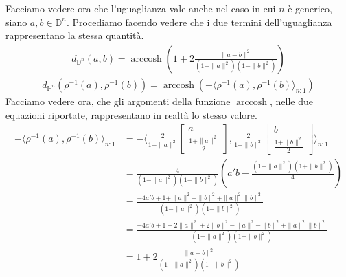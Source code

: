 \documentclass[a4paper, 12pt]{article}
\DeclareMathOperator\arccosh{arccosh}
\begin{document}
\\\\
Facciamo vedere ora che l'uguaglianza vale anche nel caso in cui $n$ è generico, siano $a, b \in \mathbb{D}^n$. Procediamo facendo vedere che i due termini dell'uguaglianza rappresentano la stessa quantità.\\
\begin{equation*}\begin{gathered}
d_{\mathbb{D}^n}(a,b) = \arccosh(1 + 2\frac{\| a - b \|^2}{(1 - \| a \|^2)(1 - \| b \|^2)})
\end{gathered}\end{equation*}
\begin{equation*}\begin{gathered}
d_{\mathbb{H}^n}(\rho^{-1}(a),\rho^{-1}(b)) = \arccosh(- \langle \rho^{-1}(a),\rho^{-1}(b) \rangle_{n:1})
\end{gathered}\end{equation*}
Facciamo vedere ora, che gli argomenti della funzione $\arccosh$, nelle due equazioni riportate, rappresentano in realtà lo stesso valore.
\begin{equation*}\begin{split}
- \langle \rho^{-1}(a),\rho^{-1}(b) \rangle_{n:1} &= - \langle \frac{2}{1 - \| a \|^2} \begin{bmatrix} a \\ \frac{1 + \| a \|^2}{2} \end{bmatrix}, \frac{2}{1 - \| b \|^2} \begin{bmatrix} b \\ \frac{1 + \| b \|^2}{2} \end{bmatrix} \rangle_{n:1}\\
&=\frac{4}{(1 - \| a \|^2)(1 - \| b \|^2)} \left( a'b - \frac{(1 + \| a \|^2)(1 + \| b \|^2)}{4} \right)\\
&=\frac{-4a'b + 1 + \| a \|^2 + \| b \|^2 + \| a \|^2 \| b \|^2}{(1 - \| a \|^2)(1 - \| b \|^2)}\\
&=\frac{-4a'b + 1 + 2\| a \|^2 + 2\| b \|^2 - \| a \|^2 - \| b \|^2 + \| a \|^2 \| b \|^2}{(1 - \| a \|^2)(1 - \| b \|^2)}\\
&=1 + 2 \frac{\| a - b \|^2}{(1 - \| a \|^2)(1 - \| b \|^2)}
\end{split}\end{equation*}
\end{document}
